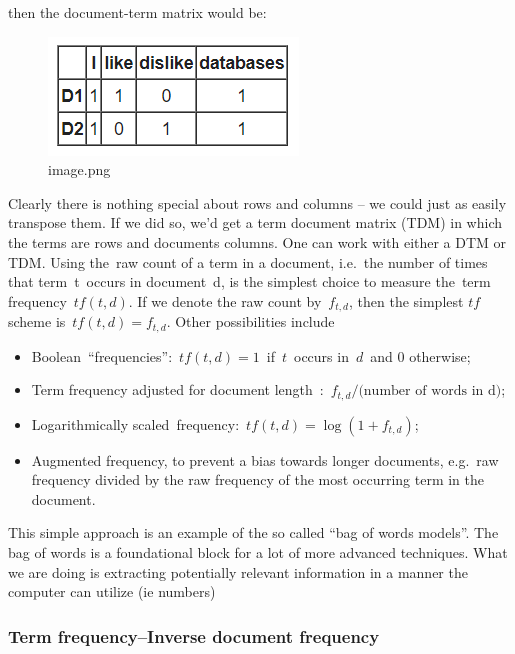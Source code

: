 \documentclass[11pt]{article}
\providecommand{\tightlist}{%
      \setlength{\itemsep}{0pt}\setlength{\parskip}{0pt}}
\begin{document}
then the document-term matrix would be:

    \begin{figure}
\centering
\includegraphics{./img/tf-idf-1.png}
\caption{image.png}
\end{figure}

    Clearly there is nothing special about rows and columns -- we could just
as easily transpose them. If we did so, we'd get a term document matrix
(TDM) in which the terms are rows and documents columns. One can work
with either a DTM or TDM. Using the~raw count of a term in a document,
i.e.~the number of times that term~t~occurs in document~d, is the
simplest choice to measure the~term frequency~\(tf(t,d)\). If we denote
the raw count by~\(f_{t,d}\), then the simplest \(tf\) scheme
is~\(tf(t,d) = f_{t,d}\). Other possibilities include

\begin{itemize}
\tightlist
\item
  Boolean~``frequencies'':~\(tf(t,d) = 1\)~if~\(t\)~occurs in~\(d\)~and
  \(0\) otherwise;
\item
  Term frequency adjusted for document
  length~:~\(f_{t,d} \big/ \text{(number of words in d)}\);
\item
  Logarithmically scaled~frequency:~\(tf(t,d) = \log (1 + f_{t,d})\);
\item
  Augmented frequency, to prevent a bias towards longer documents,
  e.g.~raw frequency divided by the raw frequency of the most occurring
  term in the document.
\end{itemize}

This simple approach is an example of the so called ``bag of words
models''. The bag of words is a foundational block for a lot of more
advanced techniques. What we are doing is extracting potentially
relevant information in a manner the computer can utilize (ie numbers)

    \hypertarget{term-frequencyinverse-document-frequency}{%
\subsubsection{Term frequency--Inverse document
frequency}\label{term-frequencyinverse-document-frequency}}
\end{document}
